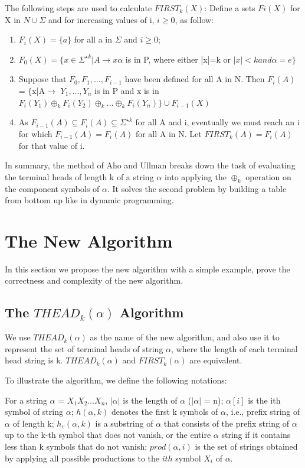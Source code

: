 \documentclass{sig-alternate-05-2015}
\begin{document}
The following steps are used to calculate $FIRST_k(X)$:
Define a sets $Fi(X)$ for X in $N \cup \Sigma$ and for increasing values of i, $i \geq 0$, as follow:
\begin{enumerate}  
\item $F_i(X) = \{a\}$ for all a in $\Sigma$ and $i \geq 0$;
\item 
$ F_0(X) = \{x \in \Sigma^{\star k} | A \rightarrow x\alpha$ is in P, where either |x|=k or $|x| < k and \alpha = e \}$
\item
Suppose that $F_0, F_1, \ldots, F_{i-1}$ have been defined for all A in N. Then
$F_i(A)$ = $\{$x|A$\rightarrow$ $Y_1,\ldots,Y_n$ is in P and x is in $F_i(Y_1) \oplus_k F_i(Y_2) \oplus_k \ldots \oplus_k F_i(Y_n)\} \cup F_{i-1}(X)$
\item
As $F_{i-1}(A) \subseteq F_i(A) \subseteq \Sigma^{\star k}$ for all A and i, eventually we must reach an i for which $F_{i-1}(A) = F_i(A)$ for all A in N.
Let $FIRST_k(A)=F_i(A)$ for that value of i.
\end{enumerate}

In summary, the method of Aho and Ullman breaks
down the task of evaluating the terminal heads of length k
of a string $\alpha$ into applying the $\oplus_k$ operation on the component
symbols of $\alpha$. It solves the second problem by building
a table from bottom up like in dynamic programming.


\section{The New Algorithm}
In this section we propose the new algorithm \cite{pager08terminal} with a simple example, prove
the correctness and complexity of the new algorithm.

\subsection{The $THEAD_k(\alpha)$ Algorithm}
We use $THEAD_k(\alpha)$ as the name of the new algorithm, and
also use it to represent the set of terminal heads of string $\alpha$,
where the length of each terminal head string is k. $THEAD_k(\alpha)$ and $FIRST_k(\alpha)$ are equivalent.

To illustrate the algorithm, we define the following notations:

For a string $\alpha$ = $X_1X_2 \ldots X_n$, $|\alpha|$ is the length of $\alpha$ ($| \alpha |$ = n);
$\alpha[i]$ is the ith symbol of string $\alpha$; $h(\alpha, k)$ denotes the first k
symbols of $\alpha$, i.e., prefix string of $\alpha$ of length k; $h_v(\alpha, k)$ is a
substring of $\alpha$ that consists of the prefix string of $\alpha$ up to
the k-th symbol that does not vanish, or the entire $\alpha$ string if
it contains less than k symbols that do not vanish; $prod(\alpha, i)$
is the set of strings obtained by applying all possible productions
to the $ith$ symbol $X_i$ of $\alpha$.
\end{document}
